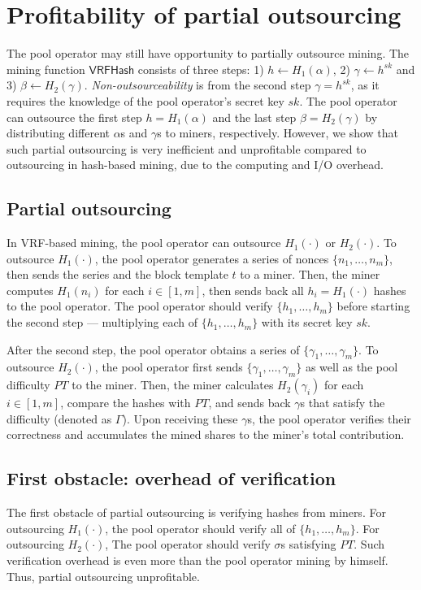 \section{Profitability of partial outsourcing}
\label{sec:partial-outsourcing}

The pool operator may still have opportunity to partially outsource mining.
The mining function $\mathsf{VRFHash}$ consists of three steps: 1) $h \gets H_1(\alpha)$, 2) $\gamma \gets h^{sk}$ and 3) $\beta \gets H_2(\gamma)$.
\emph{Non-outsourceability} is from the second step $\gamma = h^{sk}$, as it requires the knowledge of the pool operator's secret key $sk$.
The pool operator can outsource the first step $h = H_1(\alpha)$ and the last step $\beta = H_2(\gamma)$ by distributing different $\alpha$s and $\gamma$s to miners, respectively.
However, we show that such partial outsourcing is very inefficient and unprofitable compared to outsourcing in hash-based mining, due to the computing and I/O overhead.



\subsection{Partial outsourcing}

In VRF-based mining, the pool operator can outsource $H_1(\cdot)$ or $H_2(\cdot)$.
To outsource $H_1(\cdot)$, the pool operator generates a series of nonces $\{n_1, \dots, n_m\}$, then sends the series and the block template $t$ to a miner.
Then, the miner computes $H_1(n_i)$ for each $i \in [1, m]$, then sends back all $h_i = H_1(\cdot)$ hashes to the pool operator.
The pool operator should verify $\{h_1, \dots, h_m\}$ before starting the second step --- multiplying each of $\{h_1, \dots, h_m\}$ with its secret key $sk$.

After the second step, the pool operator obtains a series of $\{\gamma_1, \dots, \gamma_m\}$.
To outsource $H_2(\cdot)$, the pool operator first sends $\{\gamma_1, \dots, \gamma_m\}$ as well as the pool difficulty $PT$ to the miner.
Then, the miner calculates $H_2(\gamma_i)$ for each $i \in [1, m]$, compare the hashes with $PT$, and sends back $\gamma$s that satisfy the difficulty (denoted as $\Gamma$).
Upon receiving these $\gamma$s, the pool operator verifies their correctness and accumulates the mined shares to the miner's total contribution.


\subsection{First obstacle: overhead of verification}
The first obstacle of partial outsourcing is verifying hashes from miners.
For outsourcing $H_1(\cdot)$, the pool operator should verify all of $\{h_1, \dots, h_m\}$.
For outsourcing $H_2(\cdot)$, The pool operator should verify $\sigma$s satisfying $PT$.
Such verification overhead is even more than the pool operator mining by himself.
Thus, partial outsourcing unprofitable.



